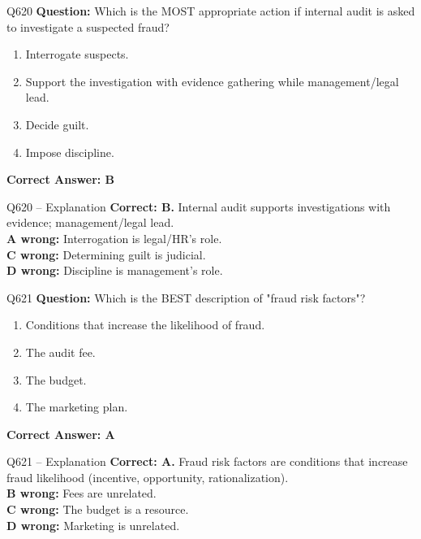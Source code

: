 \documentclass[aspectratio=169,10pt]{beamer}
\begin{document}
	\begin{frame}[t]{Q620}
		\small
		\textbf{Question:} Which is the MOST appropriate action if internal audit is asked to investigate a suspected fraud?
		\begin{enumerate}[label=\Alph*.,itemsep=1pt,topsep=2pt]
			\item Interrogate suspects.
			\item Support the investigation with evidence gathering while management/legal lead.
			\item Decide guilt.
			\item Impose discipline.
		\end{enumerate}
		\vspace{4pt}
		\textbf{Correct Answer: B}
	\end{frame}
	
	\begin{frame}[t]{Q620 -- Explanation}
		\small
		\textbf{Correct: B.} Internal audit supports investigations with evidence; management/legal lead. \\[4pt]
		\textbf{A wrong:} Interrogation is legal/HR's role. \\[2pt]
		\textbf{C wrong:} Determining guilt is judicial. \\[2pt]
		\textbf{D wrong:} Discipline is management's role.
	\end{frame}
	
	\begin{frame}[t]{Q621}
		\small
		\textbf{Question:} Which is the BEST description of "fraud risk factors"?
		\begin{enumerate}[label=\Alph*.,itemsep=1pt,topsep=2pt]
			\item Conditions that increase the likelihood of fraud.
			\item The audit fee.
			\item The budget.
			\item The marketing plan.
		\end{enumerate}
		\vspace{4pt}
		\textbf{Correct Answer: A}
	\end{frame}
	
	\begin{frame}[t]{Q621 -- Explanation}
		\small
		\textbf{Correct: A.} Fraud risk factors are conditions that increase fraud likelihood (incentive, opportunity, rationalization). \\[4pt]
		\textbf{B wrong:} Fees are unrelated. \\[2pt]
		\textbf{C wrong:} The budget is a resource. \\[2pt]
		\textbf{D wrong:} Marketing is unrelated.
	\end{frame}
	
\end{document}
